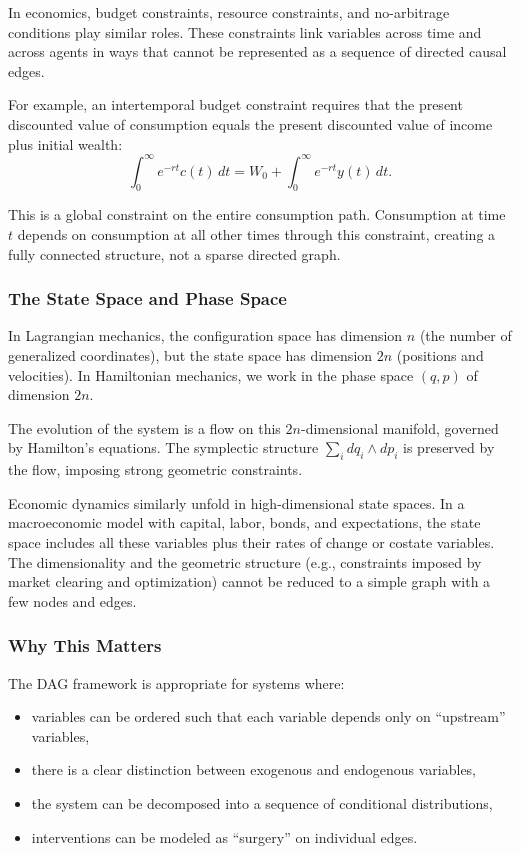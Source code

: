 \documentclass[12pt]{article}
\begin{document}
In economics, budget constraints, resource constraints, and no-arbitrage conditions play similar roles. These constraints link variables across time and across agents in ways that cannot be represented as a sequence of directed causal edges.

For example, an intertemporal budget constraint requires that the present discounted value of consumption equals the present discounted value of income plus initial wealth:
\[
\int_0^\infty e^{-rt} c(t) \, dt = W_0 + \int_0^\infty e^{-rt} y(t) \, dt.
\]

This is a global constraint on the entire consumption path. Consumption at time $t$ depends on consumption at all other times through this constraint, creating a fully connected structure, not a sparse directed graph.

\subsubsection{The State Space and Phase Space}

In Lagrangian mechanics, the configuration space has dimension $n$ (the number of generalized coordinates), but the state space has dimension $2n$ (positions and velocities). In Hamiltonian mechanics, we work in the phase space $(q, p)$ of dimension $2n$.

The evolution of the system is a flow on this $2n$-dimensional manifold, governed by Hamilton's equations. The symplectic structure $\sum_i dq_i \wedge dp_i$ is preserved by the flow, imposing strong geometric constraints.

Economic dynamics similarly unfold in high-dimensional state spaces. In a macroeconomic model with capital, labor, bonds, and expectations, the state space includes all these variables plus their rates of change or costate variables. The dimensionality and the geometric structure (e.g., constraints imposed by market clearing and optimization) cannot be reduced to a simple graph with a few nodes and edges.

\subsubsection{Why This Matters}

The DAG framework is appropriate for systems where:
\begin{itemize}
\item variables can be ordered such that each variable depends only on ``upstream'' variables,
\item there is a clear distinction between exogenous and endogenous variables,
\item the system can be decomposed into a sequence of conditional distributions,
\item interventions can be modeled as ``surgery'' on individual edges.
\end{itemize}
\end{document}
